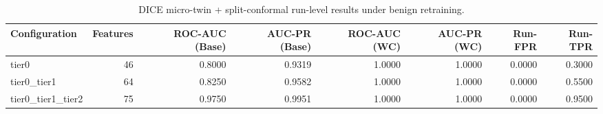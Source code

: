 \begin{table}[t]
\centering
\caption{DICE micro-twin + split-conformal run-level results under benign retraining.}
\label{tab:dice_full_overall}
\footnotesize
\begin{tabular}{lrrrrrrr}
\toprule
Configuration & Features & ROC-AUC (Base) & AUC-PR (Base) & ROC-AUC (WC) & AUC-PR (WC) & Run-FPR & Run-TPR \\
\midrule
tier0 & 46 & 0.8000 & 0.9319 & 1.0000 & 1.0000 & 0.0000 & 0.3000 \\
tier0_tier1 & 64 & 0.8250 & 0.9582 & 1.0000 & 1.0000 & 0.0000 & 0.5500 \\
tier0_tier1_tier2 & 75 & 0.9750 & 0.9951 & 1.0000 & 1.0000 & 0.0000 & 0.9500 \\
\bottomrule
\end{tabular}

\end{table}
